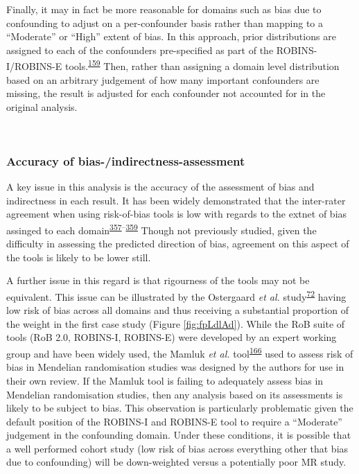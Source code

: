 \documentclass[a4paper, twoside]{templates/ociamthesis}
\begin{document}
Finally, it may in fact be more reasonable for domains such as bias due to confounding to adjust on a per-confounder basis rather than mapping to a ``Moderate'' or ``High'' extent of bias. In this approach, prior distributions are assigned to each of the confounders pre-specified as part of the ROBINS-I/ROBINS-E tools.\textsuperscript{\protect\hyperlink{ref-sterne2016}{159}} Then, rather than assigning a domain level distribution based on an arbitrary judgement of how many important confounders are missing, the result is adjusted for each confounder not accounted for in the original analysis.

~

\hypertarget{accuracy-of-bias-indirectness-assessment}{%
\subsubsection{Accuracy of bias-/indirectness-assessment}\label{accuracy-of-bias-indirectness-assessment}}

A key issue in this analysis is the accuracy of the assessment of bias and indirectness in each result. It has been widely demonstrated that the inter-rater agreement when using risk-of-bias tools is low with regards to the extnet of bias assinged to each domain\textsuperscript{\protect\hyperlink{ref-hartling2011}{357}--\protect\hyperlink{ref-minozzi2020}{359}} Though not previously studied, given the difficulty in assessing the predicted direction of bias, agreement on this aspect of the tools is likely to be lower still.

A further issue in this regard is that rigourness of the tools may not be equivalent. This issue can be illustrated by the Ostergaard \emph{et al.} study\textsuperscript{\protect\hyperlink{ref-ostergaard2015}{72}} having low risk of bias across all domains and thus receiving a substantial proportion of the weight in the first case study (Figure \ref{fig:fpLdlAd}). While the RoB suite of tools (RoB 2.0, ROBINS-I, ROBINS-E) were developed by an expert working group and have been widely used, the Mamluk \emph{et al.} tool\textsuperscript{\protect\hyperlink{ref-mamluk2020}{166}} used to assess risk of bias in Mendelian randomisation studies was designed by the authors for use in their own review. If the Mamluk tool is failing to adequately assess bias in Mendelian randomisation studies, then any analysis based on its assessments is likely to be subject to bias. This observation is particularly problematic given the default position of the ROBINS-I and ROBINS-E tool to require a ``Moderate'' judgement in the confounding domain. Under these conditions, it is possible that a well performed cohort study (low risk of bias across everything other that bias due to confounding) will be down-weighted versus a potentially poor MR study.
\end{document}
